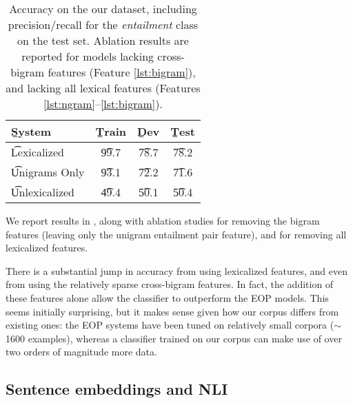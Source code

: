 %
%

\begin{table}
\begin{center}
\begin{tabular}{l@{\hskip \colspaceL}c@{\hskip \colspaceL}c@{\hskip \colspaceS}c}
\toprule
\b{System} & \b{Train} & \b{Dev} & \b{Test} \\
\midrule
\t{Lexicalized}            & \t{99.7} & \t{78.7} & \t{78.2} \\
\t{Unigrams Only}          & \t{93.1} & \t{72.2} & \t{71.6} \\
\t{Unlexicalized}          & \t{49.4} & \t{50.1} & \t{50.4} \\ %
\bottomrule
\end{tabular}
\end{center}
\caption{
\label{tab:bowresults}
Accuracy on the our dataset, including precision/recall for the
  \textit{entailment} class on the test set.
Ablation results are reported for models lacking cross-bigram features 
  (Feature \ref{lst:bigram}), and lacking all lexical
  features (Features \ref{lst:ngram}--\ref{lst:bigram}).
}
\end{table}
%
%


We report results in , along with ablation studies for removing
  the bigram features (leaving only the unigram entailment pair feature),
  and for removing all lexicalized features.

There is a substantial jump in accuracy from using
  lexicalized features, and even from using the relatively sparse
  cross-bigram features.
In fact, the addition of these features alone allow the classifier to
  outperform the EOP models.
  This seems initially surprising, but it makes sense given how our corpus differs from existing ones:
  the EOP systems have been tuned on relatively small corpora
  ($\sim$1600 examples), whereas a classifier trained on our corpus can make use of
  over two orders of magnitude more data.

\subsection{Sentence embeddings and NLI}\label{sentence-embedding}

